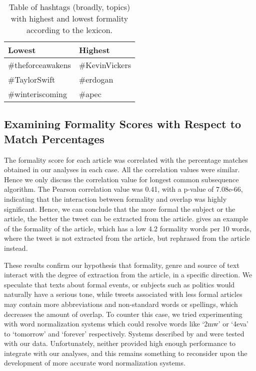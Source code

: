 \begin{table}[!t]
\centering
\begin{tabular}{|l|l|}
\hline
\textbf{Lowest}  & \textbf{Highest} \\ \hline
\#theforceawakens       & \#KevinVickers           \\
\#TaylorSwift           & \#erdogan                \\
\#winteriscoming        & \#apec                  \\ \hline
\end{tabular}
\caption[Order of formality ranking in hashtags]{Table of hashtags (broadly, topics) with highest and lowest formality according to the lexicon.}
\label{tab:formal}
\end{table}

\subsection{Examining Formality Scores with Respect to Match Percentages}

The formality score for each article was correlated with the percentage matches obtained in our analyses in each case. All the correlation values were similar. Hence we only discuss the correlation value for longest common subsequence algorithm. The Pearson correlation value was 0.41, with a p-value of 7.08e-66, indicating that the interaction between formality and overlap was highly significant. Hence, we can conclude that the more formal the subject or the article, the better the tweet can be extracted from the article.  gives an example of the formality of the article, which has a low 4.2 formality words per 10 words, where the tweet is not extracted from the article, but rephrased from the article instead. 

These results confirm our hypothesis that formality, genre and source of text interact with the degree of extraction from the article, in a specific direction. We speculate that texts about formal events, or subjects such as politics would naturally have a serious tone, while tweets associated with less formal articles may contain more abbreviations and non-standard words or spellings, which decreases the amount of overlap. To counter this case, we tried experimenting with word normalization systems which could resolve words like `2mw' or `4eva' to `tomorrow' and `forever' respectively. Systems described by \cite{yang2013log} and \cite{gouws2011contextual} were tested with our data. Unfortunately, neither provided high enough performance to integrate with our analyses, and this remains something to reconsider upon the development of more accurate word normalization systems.

